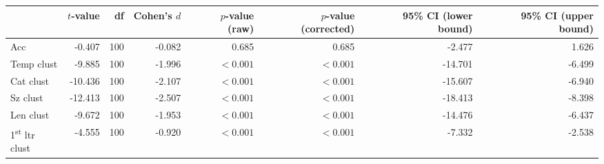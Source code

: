 \begin{tabular}{lrrrrrrr}
\toprule
{} & $t$-value &  df & Cohen's $d$ & $p$-value (raw) & $p$-value (corrected) & 95\% CI (lower bound) & 95\% CI (upper bound) \\
\midrule
Acc                             &    -0.407 & 100 &      -0.082 &           0.685 &                 0.685 &                -2.477 &                 1.626 \\
Temp clust                      &    -9.885 & 100 &      -1.996 &       $< 0.001$ &             $< 0.001$ &               -14.701 &                -6.499 \\
Cat clust                       &   -10.436 & 100 &      -2.107 &       $< 0.001$ &             $< 0.001$ &               -15.607 &                -6.940 \\
Sz clust                        &   -12.413 & 100 &      -2.507 &       $< 0.001$ &             $< 0.001$ &               -18.413 &                -8.398 \\
Len clust                       &    -9.672 & 100 &      -1.953 &       $< 0.001$ &             $< 0.001$ &               -14.476 &                -6.437 \\
1\textsuperscript{st} ltr clust &    -4.555 & 100 &      -0.920 &       $< 0.001$ &             $< 0.001$ &                -7.332 &                -2.538 \\
\bottomrule
\end{tabular}
